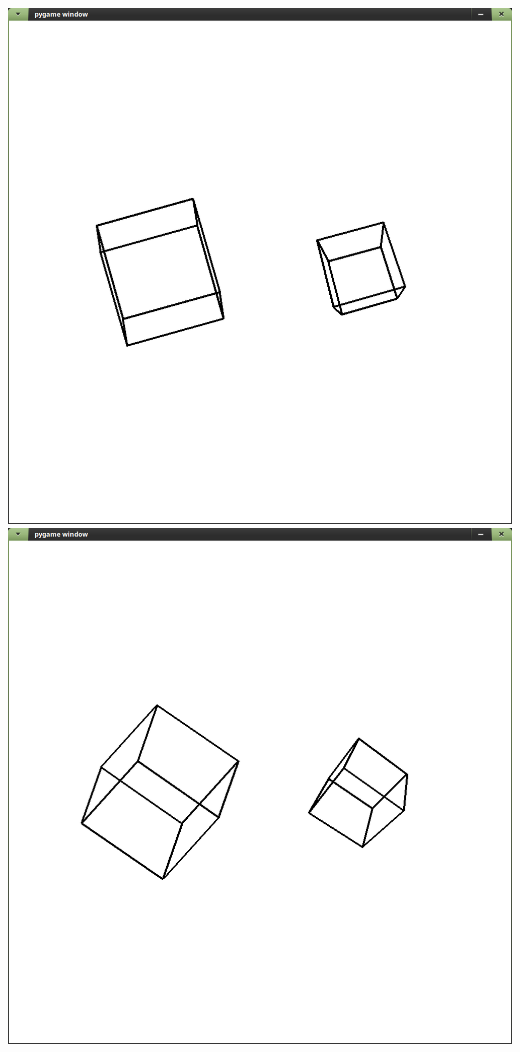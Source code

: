 \documentclass[a4paper,14pt,english,crop=false]{standalone}
\begin{document}
\includegraphics[width=\textwidth]{figures/pygame_window_065}
\includegraphics[width=\textwidth]{figures/pygame_window_066}
\end{document}
